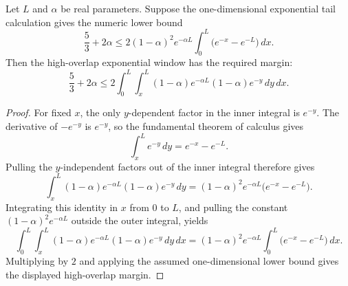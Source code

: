 \begin{helper}
Let \(L\) and \(\alpha\) be real parameters.  Suppose the one-dimensional
exponential tail calculation gives the numeric lower bound
\[
\frac53+2\alpha
\le
2(1-\alpha)^2 e^{-\alpha L}
\int_0^L \bigl(e^{-x}-e^{-L}\bigr)\,dx .
\]
Then the high-overlap exponential window has the required margin:
\[
\frac53+2\alpha
\le
2\int_0^L\int_x^L
(1-\alpha)e^{-\alpha L}(1-\alpha)e^{-y}\,dy\,dx .
\]
\end{helper}
\begin{proof}
For fixed \(x\), the only \(y\)-dependent factor in the inner integral is
\(e^{-y}\).  The derivative of \(-e^{-y}\) is \(e^{-y}\), so the fundamental
theorem of calculus gives
\[
\int_x^L e^{-y}\,dy=e^{-x}-e^{-L}.
\]
Pulling the \(y\)-independent factors out of the inner integral therefore gives
\[
\int_x^L
(1-\alpha)e^{-\alpha L}(1-\alpha)e^{-y}\,dy
=
(1-\alpha)^2 e^{-\alpha L}\bigl(e^{-x}-e^{-L}\bigr).
\]
Integrating this identity in \(x\) from \(0\) to \(L\), and pulling the constant
\((1-\alpha)^2e^{-\alpha L}\) outside the outer integral, yields
\[
\int_0^L\int_x^L
(1-\alpha)e^{-\alpha L}(1-\alpha)e^{-y}\,dy\,dx
=
(1-\alpha)^2 e^{-\alpha L}
\int_0^L \bigl(e^{-x}-e^{-L}\bigr)\,dx .
\]
Multiplying by \(2\) and applying the assumed one-dimensional lower bound gives
the displayed high-overlap margin.
\end{proof}
